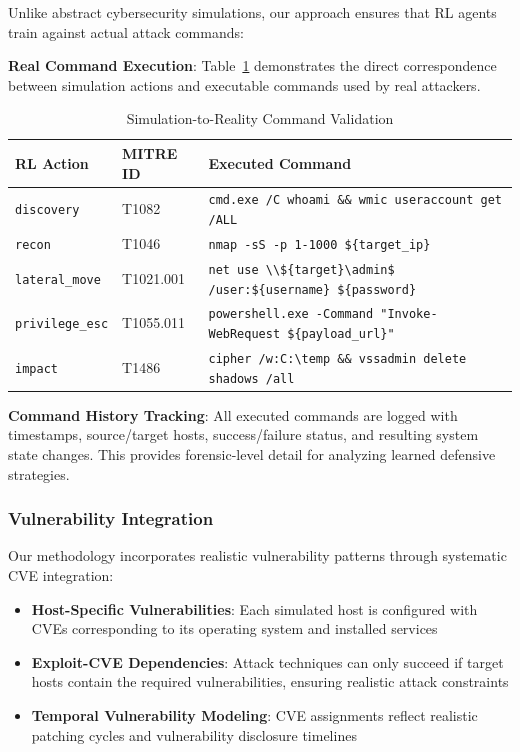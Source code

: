 Unlike abstract cybersecurity simulations, our approach ensures that RL agents train against actual attack commands:

\textbf{Real Command Execution}: Table~\ref{tab:command_validation} demonstrates the direct correspondence between simulation actions and executable commands used by real attackers.

\begin{table}[H]
\centering
\caption{Simulation-to-Reality Command Validation}
\label{tab:command_validation}
\begin{tabular}{p{2.5cm}p{2cm}p{8.5cm}}
\toprule
\textbf{RL Action} & \textbf{MITRE ID} & \textbf{Executed Command} \\
\midrule
\texttt{discovery} & T1082 & \texttt{cmd.exe /C whoami \&\& wmic useraccount get /ALL} \\
\texttt{recon} & T1046 & \texttt{nmap -sS -p 1-1000 \$\{target\_ip\}} \\
\texttt{lateral\_move} & T1021.001 & \texttt{net use \textbackslash\textbackslash\$\{target\}\textbackslash admin\$ /user:\$\{username\} \$\{password\}} \\
\texttt{privilege\_esc} & T1055.011 & \texttt{powershell.exe -Command "Invoke-WebRequest \$\{payload\_url\}"} \\
\texttt{impact} & T1486 & \texttt{cipher /w:C:\textbackslash temp \&\& vssadmin delete shadows /all} \\
\bottomrule
\end{tabular}
\end{table}

\textbf{Command History Tracking}: All executed commands are logged with timestamps, source/target hosts, success/failure status, and resulting system state changes. This provides forensic-level detail for analyzing learned defensive strategies.

\subsubsection{Vulnerability Integration}

Our methodology incorporates realistic vulnerability patterns through systematic CVE integration:

\begin{itemize}
    \item \textbf{Host-Specific Vulnerabilities}: Each simulated host is configured with CVEs corresponding to its operating system and installed services
    
    \item \textbf{Exploit-CVE Dependencies}: Attack techniques can only succeed if target hosts contain the required vulnerabilities, ensuring realistic attack constraints
    
    \item \textbf{Temporal Vulnerability Modeling}: CVE assignments reflect realistic patching cycles and vulnerability disclosure timelines
\end{itemize}

